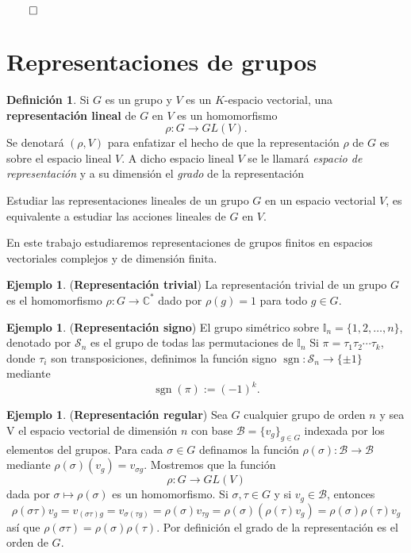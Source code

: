 \documentclass[12pt]{book}
\theoremstyle{definition}
\newtheorem{definition}[theorem]{Definición}
\newtheorem{example}[theorem]{Ejemplo}
\DeclareMathOperator{\sgn}{sgn}
\newcounter{in}
\newcounter{ini}
\begin{document}
{$\qed$

\section{Representaciones de grupos}

\begin{definition}
  Si $G$ es un grupo y $V$ es un $K$-espacio vectorial, una
  \textbf{representación lineal} de $G$ en $V$ es un homomorfismo 
     $$\rho:G\rightarrow GL(V).$$
  Se denotará $(\rho,V)$ para enfatizar el hecho de que la
  representación $\rho$ de $G$  es sobre el espacio lineal $V$. A
  dicho espacio lineal $V$ se le llamará \emph{espacio de representación} y a
  su dimensión el \emph{grado} de la representación 
\end{definition}

Estudiar las representaciones lineales de un grupo $G$ en un espacio
vectorial $V$, es equivalente a estudiar las acciones lineales de $G$
en $V$. 

En este trabajo estudiaremos representaciones de grupos finitos en
espacios vectoriales complejos y de dimensión finita. 

\begin{example}(\textbf{Representación trivial})
  La representación trivial de un grupo $G$ es el homomorfismo
  $\rho:G\rightarrow \mathbb{C^{*}}$ dado por $\rho(g)=1$ para todo
  $g\in G$.
\end{example}

\begin{example}(\textbf{Representación signo})
  El grupo simétrico sobre $\mathbb{I}_{n}=\{1,2,\ldots,n\}$, denotado
  por $\mathcal{S}_{n}$ es el grupo de todas las permutaciones de $\mathbb{I}_{n}$ 
  Si $\pi=\tau_{1}\tau_{2}\cdots\tau_{k}$, donde $\tau_{i}$ son
  transposiciones, definimos la función signo
  $\sgn:\mathcal{S}_{n} \rightarrow\{\pm1\}$ mediante $$\sgn(\pi):=(-1)^{k}.$$
\end{example}

\begin{example}(\textbf{Representación regular})
  Sea $G$ cualquier grupo de orden $n$ y sea V el espacio vectorial de
  dimensión $n$ con base $\mathcal{B}=\{v_{g}\}_{g\in G}$ indexada por
  los elementos del grupos. Para cada $\sigma\in G$ definamos la función
  $\rho(\sigma):\mathcal{B}\rightarrow \mathcal{B}$ mediante $\rho(\sigma)(v_{g})=v_{\sigma g}$.
  Mostremos que la función $$\rho:G\rightarrow GL(V)$$ dada por
  $\sigma\mapsto\rho(\sigma)$ es un homomorfismo. Si $\sigma,\tau \in G$
  y si $v_{g}\in \mathcal{B}$, entonces $$\rho(\sigma
  \tau)v_{g}=v_{(\sigma\tau)g}=v_{\sigma(\tau g)}=\rho(\sigma)v_{\tau
    g}=\rho(\sigma)(\rho(\tau)v_{g})=\rho(\sigma)\rho(\tau)v_{g} $$
  así que $\rho(\sigma\tau)=\rho(\sigma)\rho(\tau)$. Por definición el 
  grado de la representación es el orden de $G$.


\end{example}}
\end{document}

